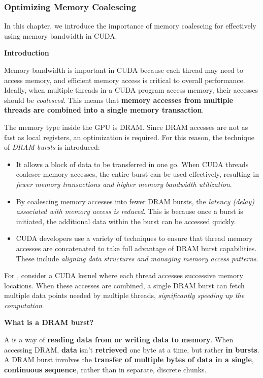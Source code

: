 \subsubsection{Optimizing Memory Coalescing}

In this chapter, we introduce the importance of memory coalescing for effectively using memory bandwidth in CUDA.

\begin{flushleft}
    \textcolor{Green3}{ \textbf{Introduction}}
\end{flushleft}
Memory bandwidth is important in CUDA because each thread may need to access memory, and efficient memory access is critical to overall performance. Ideally, when multiple threads in a CUDA program access memory, their accesses should be \emph{coalesced}. This means that \textbf{memory accesses from multiple threads are combined into a single memory transaction}.

\highspace
The memory type inside the GPU is DRAM. Since DRAM accesses are not as fast as local registers, an optimization is required. For this reason, the technique of \emph{DRAM bursts} is introduced:
\begin{itemize}
    \item It allows a block of data to be transferred in one go. When CUDA threads coalesce memory accesses, the entire burst can be used effectively, resulting in \emph{fewer memory transactions and higher memory bandwidth utilization}.

    \item By coalescing memory accesses into fewer DRAM bursts, the \emph{latency (delay) associated with memory access is reduced}. This is because once a burst is initiated, the additional data within the burst can be accessed quickly.

    \item CUDA developers use a variety of techniques to ensure that thread memory accesses are concatenated to take full advantage of DRAM burst capabilities. These include \emph{aligning data structures and managing memory access patterns}.
\end{itemize}
For , consider a CUDA kernel where each thread accesses successive memory locations. When these accesses are combined, a single DRAM burst can fetch multiple data points needed by multiple threads, \emph{significantly speeding up the computation}.

\highspace
\begin{flushleft}
    \textcolor{Green3}{ \textbf{What is a DRAM burst?}}
\end{flushleft}
A  is a way of \textbf{reading data from or writing data to memory}. When accessing DRAM, \textbf{data} isn't \textbf{retrieved} one byte at a time, but rather \textbf{in bursts}. A DRAM burst involves the \textbf{transfer of multiple bytes of data in a single}, \textbf{continuous sequence}, rather than in separate, discrete chunks.

